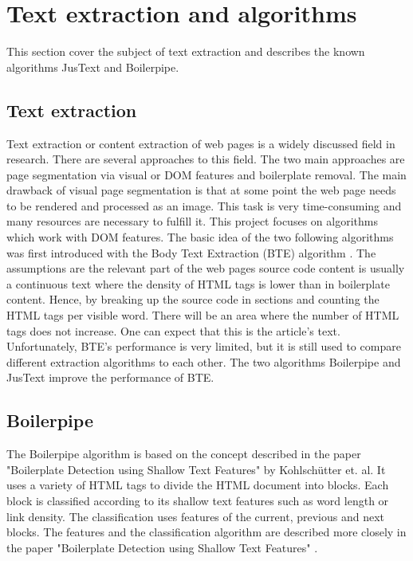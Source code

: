  \section{Text extraction and algorithms}

 This section cover the subject of text extraction and describes the known algorithms JusText and Boilerpipe.

 \subsection{Text extraction}

 Text extraction or content extraction of web pages is a widely discussed field in research. There are several approaches to this field. The two main approaches are page segmentation via visual or DOM features and boilerplate removal. The main drawback of visual page segmentation is that at some point the web page needs to be rendered and processed as an image. This task is very time-consuming and many resources are necessary to fulfill it. This project focuses on algorithms which work with DOM features.
 The basic idea of the two following algorithms was first introduced with the Body Text Extraction (BTE) algorithm \cite{Finn01factor}. The assumptions are the relevant part of the web pages source code content is usually a continuous text where the density of HTML tags is lower than in boilerplate content. Hence, by breaking up the source code in sections and counting the HTML tags per visible word. There will be an area where the number of HTML tags does not increase. One can expect that this is the article's text. Unfortunately, BTE's performance is very limited, but it is still used to compare different extraction algorithms to each other. The two algorithms Boilerpipe and JusText improve the performance of BTE.

 \subsection{Boilerpipe}

 The Boilerpipe  algorithm \cite{algo:boilerpipe} is based on the concept described in the paper "Boilerplate Detection using Shallow Text Features" \cite{paper:boilerpipe} by Kohlschütter et. al. It uses a variety of HTML tags  to divide the HTML document into blocks. Each block is classified according to its shallow text features such as word length or link density. The classification uses features of the current, previous and next blocks. The features and the classification algorithm are described more closely in the paper "Boilerplate Detection using Shallow Text Features" \cite{paper:boilerpipe}.

